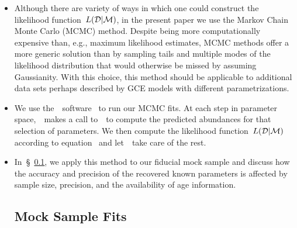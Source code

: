 \documentclass[ms.tex]{subfiles}
\begin{document}
\begin{itemize}
	\item Although there are variety of ways in which one could construct the
	likelihood function~$L(\mathcal{D} | \mathcal{M})$, in the present paper we
	use the Markov Chain Monte Carlo (MCMC) method.
	Despite being more computationally expensive than, e.g., maximum likelihood
	estimates, MCMC methods offer a more generic solution than by sampling
	tails and multiple modes of the likelihood distribution that would
	otherwise be missed by assuming Gaussianity.
	With this choice, this method should be applicable to additional data sets
	perhaps described by GCE models with different parametrizations.

	\item We use the~\mc~software~\citep{Foreman-Mackey2013} to run our MCMC
	fits.
	At each step in parameter space,~\mc~makes a call to~\vice~to compute the
	predicted abundances for that selection of parameters.
	We then compute the likelihood function~$L(\mathcal{D} | \mathcal{M})$
	according to equation~ and let~\mc~take care of
	the rest.

	\item In~\S~\ref{sec:methods:mocksamplefits}, we apply this method to our
	fiducial mock sample and discuss how the accuracy and precision of the
	recovered known parameters is affected by sample size, precision, and
	the availability of age information.

\subsection{Mock Sample Fits}
\label{sec:methods:mocksamplefits}

\end{itemize}
\end{document}
